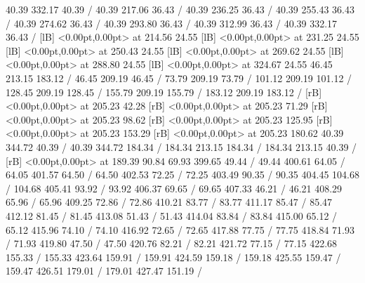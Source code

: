 {\setsolid
{} 40.39 332.17 40.39 /
\setsolid
{} 40.39 217.06 36.43 /
\setsolid
{} 40.39 236.25 36.43 /
\setsolid
{} 40.39 255.43 36.43 /
\setsolid
{} 40.39 274.62 36.43 /
\setsolid
{} 40.39 293.80 36.43 /
\setsolid
{} 40.39 312.99 36.43 /
\setsolid
{} 40.39 332.17 36.43 /
  [lB] <0.00pt,0.00pt> at 214.56 24.55
  [lB] <0.00pt,0.00pt> at 231.25 24.55
  [lB] <0.00pt,0.00pt> at 250.43 24.55
  [lB] <0.00pt,0.00pt> at 269.62 24.55
  [lB] <0.00pt,0.00pt> at 288.80 24.55
  [lB] <0.00pt,0.00pt> at 324.67 24.55
\setsolid
{} 46.45 213.15 183.12 /
\setsolid
{} 46.45 209.19 46.45 /
\setsolid
{} 73.79 209.19 73.79 /
\setsolid
{} 101.12 209.19 101.12 /
\setsolid
{} 128.45 209.19 128.45 /
\setsolid
{} 155.79 209.19 155.79 /
\setsolid
{} 183.12 209.19 183.12 /
 [rB] <0.00pt,0.00pt> at 205.23 42.28
 [rB] <0.00pt,0.00pt> at 205.23 71.29
 [rB] <0.00pt,0.00pt> at 205.23 98.62
 [rB] <0.00pt,0.00pt> at 205.23 125.95
 [rB] <0.00pt,0.00pt> at 205.23 153.29
 [rB] <0.00pt,0.00pt> at 205.23 180.62
\setsolid
{} 40.39 344.72 40.39 /
 40.39 344.72 184.34 /
 184.34 213.15 184.34 /
 184.34 213.15 40.39 /
 [rB] <0.00pt,0.00pt> at 189.39 90.84
\setsolid
{} 69.93 399.65 49.44 /
 49.44 400.61 64.05 /
 64.05 401.57 64.50 /
 64.50 402.53 72.25 /
 72.25 403.49 90.35 /
 90.35 404.45 104.68 /
 104.68 405.41 93.92 /
 93.92 406.37 69.65 /
 69.65 407.33 46.21 /
 46.21 408.29 65.96 /
 65.96 409.25 72.86 /
 72.86 410.21 83.77 /
 83.77 411.17 85.47 /
 85.47 412.12 81.45 /
 81.45 413.08 51.43 /
 51.43 414.04 83.84 /
 83.84 415.00 65.12 /
 65.12 415.96 74.10 /
 74.10 416.92 72.65 /
 72.65 417.88 77.75 /
 77.75 418.84 71.93 /
 71.93 419.80 47.50 /
 47.50 420.76 82.21 /
 82.21 421.72 77.15 /
 77.15 422.68 155.33 /
 155.33 423.64 159.91 /
 159.91 424.59 159.18 /
 159.18 425.55 159.47 /
 159.47 426.51 179.01 /
 179.01 427.47 151.19 /
}
